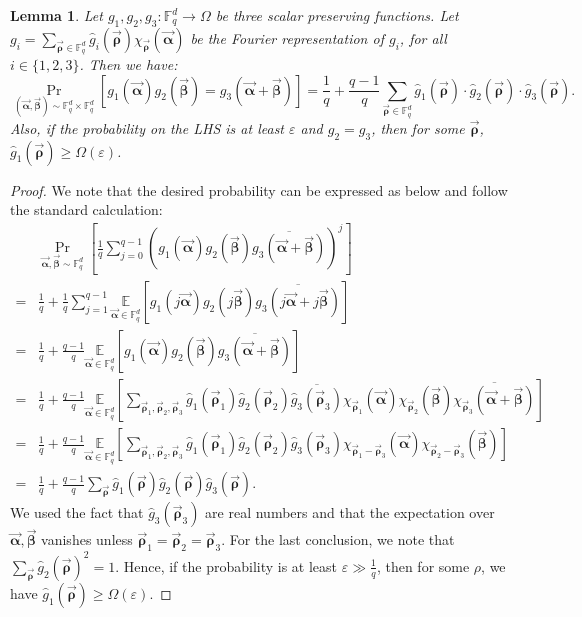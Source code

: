 \documentclass[11pt]{article}
\newcommand{\F}{\mathbb{F}}
\newtheorem{lemma}[theorem]{Lemma}
\renewcommand{\epsilon}{\varepsilon}
\newcommand{\alphab}{\vec{\bm{\alpha}}}
\newcommand{\betab}{\vec{\bm{\beta}}}
\newcommand{\rhob}{\vec{\bm{\rho}}}
\begin{document}
\begin{lemma}\label{lem:lintestcoeff}
Let $g_1,g_2,g_3:\F_q^d\to\Omega$ be three scalar preserving functions. Let $g_i=\underset{\rhob\in\F_q^d}{\sum}\hat{g}_i(\rhob)\chi_{\rhob}(\alphab)$ be the Fourier representation of $g_i$, for all $i\in\{1,2,3\}$. Then we have:
$$
\Pr_{(\alphab,\betab)\sim \F_q^d\times \F_q^d}[g_1(\alphab)g_2(\betab)=g_3(\alphab+\betab)]=\frac{1}{q}+\frac{q-1}{q}\sum_{\rhob\in\F_q^d} \hat{g}_1(\rhob)\cdot \hat{g}_2(\rhob)\cdot {\hat{g}_3(\rhob)}.
$$
Also, if the probability on the LHS is at least $\epsilon$ and $g_2=g_3$, then for some $\rhob$, $\hat{g}_1(\rhob) \geq \Omega(\epsilon)$. 
\end{lemma}\begin{proof} We note that the desired probability can be expressed as below and follow the standard calculation: 
\begin{align*}
& \underset{\alphab,\betab\sim\F_q^d}{\Pr}\left[ \frac{1}{q} \sum_{j=0}^{q-1} (g_1(\alphab)g_2(\betab)\overline{g_3(\alphab+\betab)})^j  \right] \\ 
= & \frac{1}{q} + \frac{1}{q} \sum_{j=1}^{q-1}  \underset{\alphab\in\F_q^d}{\mathbb{E}}\left[ g_1(j\alphab)g_2(j\betab)\overline{g_3(j\alphab+j\betab)}  \right]\\
= & \frac{1}{q} + \frac{q-1}{q}  \underset{\alphab\in\F_q^d}{\mathbb{E}}\left[ g_1(\alphab)g_2(\betab)\overline{g_3(\alphab+\betab)}  \right]\\
= & \frac{1}{q} + \frac{q-1}{q}  \underset{\alphab\in\F_q^d}{\mathbb{E}}\left[ \sum_{{\rhob}_1, {\rhob}_2, {\rhob}_3 } 
\hat{g}_1({\rhob}_1)\hat{g}_2({\rhob}_2)  \overline{\hat{g}_3({\rhob}_3)}   \chi_{\rhob_1}(\alphab) \chi_{\rhob_2}(\betab) 
\overline{\chi_{\rhob_3}(\alphab+\betab)} 
 \right]\\
 = & \frac{1}{q} + \frac{q-1}{q}  \underset{\alphab\in\F_q^d}{\mathbb{E}}\left[ \sum_{{\rhob}_1, {\rhob}_2, {\rhob}_3 }
\hat{g}_1({\rhob}_1)\hat{g}_2({\rhob}_2)  \hat{g}_3({\rhob}_3)   \chi_{\rhob_1-\rhob_3}(\alphab) \chi_{\rhob_2-\rhob_3}(\betab)
 \right]\\
 = & \frac{1}{q} + \frac{q-1}{q}   \sum_{\rhob }
\hat{g}_1({\rhob})\hat{g}_2({\rhob})  \hat{g}_3({\rhob}).  
\end{align*} 
We used the fact that $\hat{g}_3(\rhob_3)$ are real numbers and that the expectation over $\alphab, \betab$ vanishes unless 
$\rhob_1 = \rhob_2 = \rhob_3$. 
For the last conclusion, we note that $\sum_{\rhob} \hat{g}_2(\rhob)^2 = 1$.  Hence, if the probability is at least $\epsilon \gg \frac{1}{q}$,
then for some $\rho$, we have $\hat{g}_1(\rhob) \geq \Omega(\epsilon)$.  \qedhere 
\end{proof}
\end{document}
